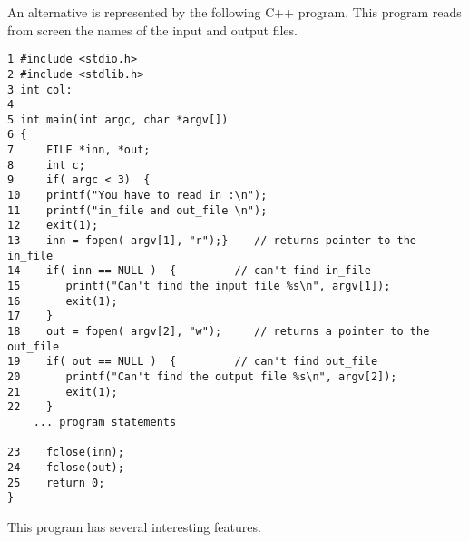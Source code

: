 An alternative is represented by the following C++ program.
This program reads from screen the names of the input and output
files.
\begin{lstlisting}[title={\url{http://folk.uio.no/mhjensen/compphys/programs/chapter03/cpp/program2.cpp}}]
1 #include <stdio.h>
2 #include <stdlib.h>
3 int col:
4
5 int main(int argc, char *argv[])
6 {
7     FILE *inn, *out;
8     int c;
9     if( argc < 3)  {
10    printf("You have to read in :\n");
11    printf("in_file and out_file \n");
12    exit(1);
13    inn = fopen( argv[1], "r");}    // returns pointer to the in_file 
14    if( inn == NULL )  {         // can't find in_file     
15       printf("Can't find the input file %s\n", argv[1]);
16       exit(1);
17    }
18    out = fopen( argv[2], "w");     // returns a pointer to the out_file  
19    if( out == NULL )  {         // can't find out_file     
20       printf("Can't find the output file %s\n", argv[2]);
21       exit(1);
22    }
    ... program statements

23    fclose(inn);
24    fclose(out);
25    return 0;
} 
\end{lstlisting}
This program has several interesting features.
%
